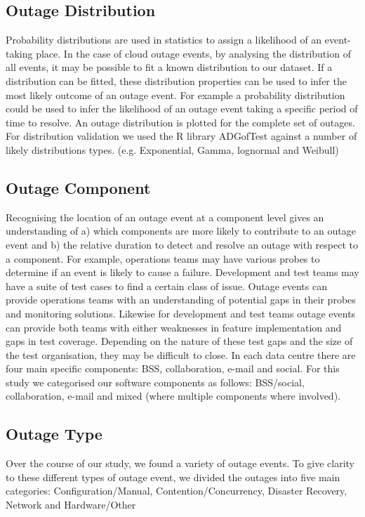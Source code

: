 \subsection{Outage Distribution}

Probability distributions are used in statistics to assign a likelihood of an event-taking place. In the case of cloud outage events, by analysing the distribution of all events, it may be possible to fit a known distribution to our dataset. If a distribution can be fitted, these distribution properties can be used to infer the most likely outcome of an outage event. For example a probability distribution could be used to infer the likelihood of an outage event taking a specific period of time to resolve. An outage distribution is plotted for the complete set of outages. For distribution validation we used the R library ADGofTest \cite{ADGoF} against a number of likely distributions types. (e.g. Exponential, Gamma, lognormal and Weibull)

\subsection{Outage Component}

Recognising the location of an outage event at a component level gives an understanding of a) which components are more likely to contribute to an outage event and b) the relative duration to detect and resolve an outage with respect to a component. For example, operations teams may have various probes to determine if an event is likely to cause a failure. Development and test teams may have a suite of test cases to find a certain class of issue. Outage events can provide operations teams with an understanding of potential gaps in their probes and monitoring solutions. Likewise for development and test teams outage events can provide both teams with either weaknesses in feature implementation and gaps in test coverage. Depending on the nature of these test gaps and the size of the test organisation, they may be difficult to close. In each data centre there are four main specific components: BSS, collaboration, e-mail and social. For this study we categorised our software components as follows: BSS/social, collaboration, e-mail and mixed (where multiple components where involved). \par

\subsection{Outage Type}
Over the course of our study, we found a variety of outage events. To give clarity to these different types of outage event, we divided the outages into five main categories: Configuration/Manual, Contention/Concurrency, Disaster Recovery, Network and Hardware/Other \par

